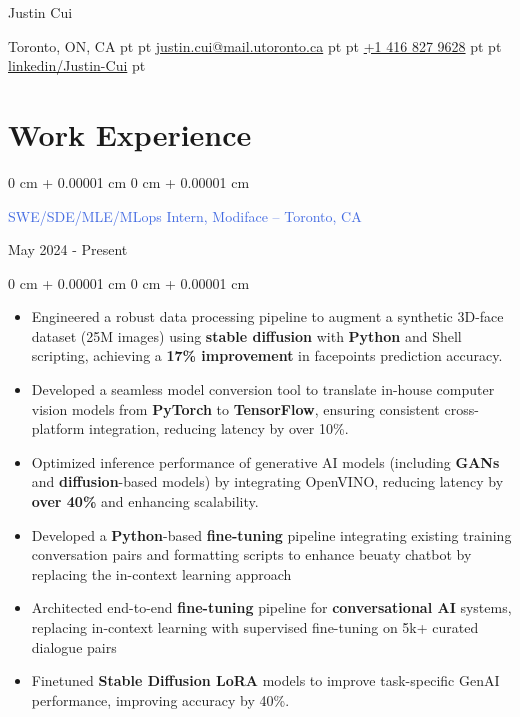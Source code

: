 \documentclass[10pt, letterpaper]{article}
\newenvironment{highlights}{
    \begin{itemize}[
        topsep=0.10 cm,
        parsep=0.10 cm,
        partopsep=0pt,
        itemsep=0pt,
        leftmargin=0 cm + 10pt
    ]
}{
    \end{itemize}
}
\newenvironment{onecolentry}{
    \begin{adjustwidth}{
        0 cm + 0.00001 cm
    }{
        0 cm + 0.00001 cm
    }
}{
    \end{adjustwidth}
}
\newenvironment{twocolentry}[2][]{
    \onecolentry
    \def\secondColumn{#2}
    \setcolumnwidth{\fill, 4.5 cm}
    \begin{paracol}{2}
}{
    \switchcolumn \raggedleft \secondColumn
    \end{paracol}
    \endonecolentry
}
\newenvironment{header}{
    \setlength{\topsep}{0pt}\par\kern\topsep\centering\linespread{1.5}
}{
    \par\kern\topsep
}
\begin{document}
\begin{header}
    \fontsize{25 pt}{25 pt}\selectfont Justin Cui

    \vspace{1 pt}

    \normalsize
    Toronto, ON, CA%
     pt%
    \AND%
     pt%
    \href{mailto:justin.cui@mail.utoronto.ca}{justin.cui@mail.utoronto.ca}%
     pt%
    \AND%
     pt%
    \href{tel:+1-416-827-9628}{+1 416 827 9628}%
     pt%
    \AND%
     pt%
    \href{https://www.linkedin.com/in/justin-cui-b7b654181/}{linkedin/Justin-Cui}%
     pt%

\end{header}

\vspace{5 pt - 0.3 cm}

\section{Work Experience}
\vspace{0.10 cm}
\begin{twocolentry}{May 2024 - Present}
    {\textcolor{royalblue}{SWE/SDE/MLE/MLops Intern, Modiface -- Toronto, CA}}
\end{twocolentry}
\vspace{0.05 cm}
\begin{onecolentry}
    \begin{highlights}
        \item Engineered a robust data processing pipeline to augment a synthetic 3D-face dataset (25M images) using \textbf{ stable diffusion} with \textbf{Python} and Shell scripting, achieving a \textbf{17\% improvement }in facepoints prediction accuracy.
        \item Developed a seamless model conversion tool to translate in-house computer vision models from \textbf{PyTorch} to \textbf{TensorFlow}, ensuring consistent cross-platform integration, reducing latency by over 10\%.
        \item Optimized inference performance of generative AI models (including \textbf{GANs} and \textbf{diffusion}-based models) by integrating OpenVINO, reducing latency by \textbf{over 40\%} and enhancing scalability.
        \item Developed a \textbf{Python}-based\textbf{ fine-tuning} pipeline integrating existing training conversation pairs and formatting scripts to enhance beuaty chatbot by replacing the in-context learning approach
        \item Architected end-to-end\textbf{ fine-tuning }pipeline for \textbf{conversational AI }systems, replacing in-context learning with supervised fine-tuning on 5k+ curated dialogue pairs
        \item Finetuned \textbf{Stable Diffusion LoRA} models to improve task-specific GenAI performance, improving accuracy by 40\%.
    \end{highlights}
\end{onecolentry}
\end{document}
